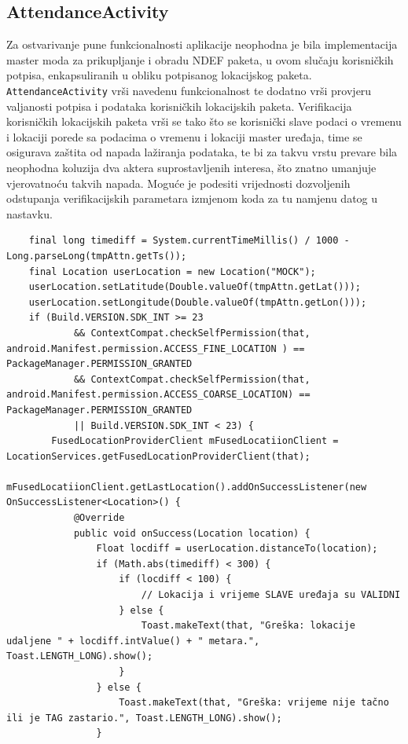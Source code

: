 \subsection{AttendanceActivity}
Za ostvarivanje pune funkcionalnosti aplikacije neophodna je bila implementacija master moda za prikupljanje i obradu NDEF paketa, u ovom slučaju korisničkih potpisa, enkapsuliranih u obliku potpisanog lokacijskog paketa. \texttt{AttendanceActivity} vrši navedenu funkcionalnost te dodatno vrši provjeru valjanosti potpisa i podataka korisničkih lokacijskih paketa. Verifikacija korisničkih lokacijskih paketa vrši se tako što se korisnički slave podaci o vremenu i lokaciji porede sa podacima o vremenu i lokaciji master uređaja, time se osigurava zaštita od napada lažiranja podataka, te bi za takvu vrstu prevare bila neophodna koluzija dva aktera suprostavljenih interesa, što znatno umanjuje vjerovatnoću takvih napada. Moguće je podesiti vrijednosti dozvoljenih odstupanja verifikacijskih parametara izmjenom koda za tu namjenu datog u nastavku.

\begin{verbatim}
    final long timediff = System.currentTimeMillis() / 1000 - Long.parseLong(tmpAttn.getTs());
    final Location userLocation = new Location("MOCK");
    userLocation.setLatitude(Double.valueOf(tmpAttn.getLat()));
    userLocation.setLongitude(Double.valueOf(tmpAttn.getLon()));
    if (Build.VERSION.SDK_INT >= 23
            && ContextCompat.checkSelfPermission(that, android.Manifest.permission.ACCESS_FINE_LOCATION ) == PackageManager.PERMISSION_GRANTED
            && ContextCompat.checkSelfPermission(that, android.Manifest.permission.ACCESS_COARSE_LOCATION) == PackageManager.PERMISSION_GRANTED
            || Build.VERSION.SDK_INT < 23) {
        FusedLocationProviderClient mFusedLocatiionClient = LocationServices.getFusedLocationProviderClient(that);
        mFusedLocatiionClient.getLastLocation().addOnSuccessListener(new OnSuccessListener<Location>() {
            @Override
            public void onSuccess(Location location) {
                Float locdiff = userLocation.distanceTo(location);
                if (Math.abs(timediff) < 300) {
                    if (locdiff < 100) {
                        // Lokacija i vrijeme SLAVE uređaja su VALIDNI
                    } else {
                        Toast.makeText(that, "Greška: lokacije udaljene " + locdiff.intValue() + " metara.", Toast.LENGTH_LONG).show();
                    }
                } else {
                    Toast.makeText(that, "Greška: vrijeme nije tačno ili je TAG zastario.", Toast.LENGTH_LONG).show();
                }
\end{verbatim}

